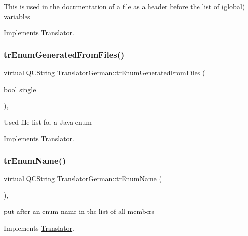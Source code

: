 This is used in the documentation of a file as a header before the list of (global) variables 

Implements \mbox{\hyperlink{class_translator}{Translator}}.

\mbox{\label{class_translator_german_ae855091a10623ee2d849d12e3e2af8a7}} 
\subsubsection{\texorpdfstring{trEnumGeneratedFromFiles()}{trEnumGeneratedFromFiles()}}
{\footnotesize\ttfamily virtual \mbox{\hyperlink{class_q_c_string}{Q\+C\+String}} Translator\+German\+::tr\+Enum\+Generated\+From\+Files (\begin{DoxyParamCaption}\item[{bool}]{single }\end{DoxyParamCaption})\hspace{0.3cm}{\ttfamily [inline]}, {\ttfamily [virtual]}}

Used file list for a Java enum 

Implements \mbox{\hyperlink{class_translator}{Translator}}.

\mbox{\label{class_translator_german_a1511fc50e8da7ede48cb448f247d58d9}} 
\subsubsection{\texorpdfstring{trEnumName()}{trEnumName()}}
{\footnotesize\ttfamily virtual \mbox{\hyperlink{class_q_c_string}{Q\+C\+String}} Translator\+German\+::tr\+Enum\+Name (\begin{DoxyParamCaption}{ }\end{DoxyParamCaption})\hspace{0.3cm}{\ttfamily [inline]}, {\ttfamily [virtual]}}

put after an enum name in the list of all members 

Implements \mbox{\hyperlink{class_translator}{Translator}}.

\mbox{\label{class_translator_german_ad018b4fccab9a1c57d5567774f155083}} 

